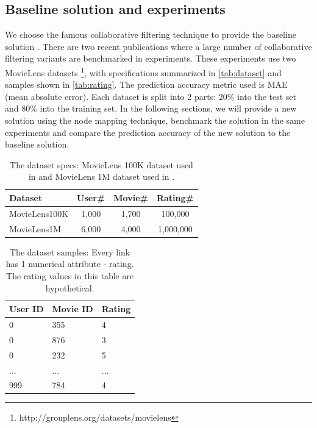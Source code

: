 \documentclass[twocolumn]{article}
\begin{document}
\subsection{Baseline solution and experiments}
We choose the famous collaborative filtering technique to provide the baseline 
solution \cite{polatidis2016multi}.
There are two recent publications where a large number of collaborative 
filtering variants are benchmarked \cite{hwang2016efficient} 
\cite{polatidis2016multi} in experiments.
These experiments use two MovieLens datasets \cite{harper2015movielens} 
\footnote{http://grouplens.org/datasets/movielens},
with specifications summarized in \autoref{tab:dataset} and samples shown in 
\autoref{tab:rating}.
The prediction accuracy metric used is MAE (mean absolute error).
Each dataset is split into 2 parts: 20\% into the test set and 80\% into the 
training set.
In the following sections, we will provide a new solution using the node 
mapping technique, benchmark the solution in the same experiments and compare 
the 
prediction accuracy of the new solution to the baseline solution.
\begin{table}[h]
	\centering
	\caption{The dataset specs: MovieLens 100K dataset used in 
	\cite{hwang2016efficient} and 
	MovieLens 1M dataset used in \cite{polatidis2016multi}.}
	\begin{tabularx}{0.5\textwidth}{ |X|c|c|c|}  \hline
		\textbf{Dataset} & \textbf{User\#} & \textbf{Movie\#} & 		
		\textbf{Rating\#} 
		\\ \hline
		MovieLens100K & 1,000 & 1,700 & 100,000 \\ \hline
		MovieLens1M & 6,000 & 4,000 & 1,000,000 \\ \hline
	\end{tabularx}
	\label{tab:dataset}
\end{table}
\begin{table}[h]
	\centering
	\caption{The dataset samples: Every link has 1 numerical attribute - 
		rating. The rating values in this table are hypothetical.}
	\begin{tabularx}{0.5\textwidth}{ |X|X|X| }  \hline
		\textbf{User ID} & \textbf{Movie ID} & \textbf{Rating} \\ \hline
		0 & 355 & 4 \\ \hline
		0 & 876 & 3 \\ \hline
		0 & 232 & 5 \\ \hline
		... & ... & ... \\ \hline
		999 & 784 & 4 \\ \hline
	\end{tabularx}
	\label{tab:rating}
\end{table}
\end{document}
